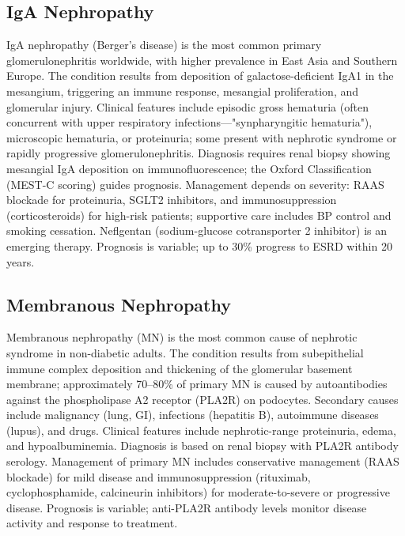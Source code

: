 \subsection{IgA Nephropathy}
\label{sec:IgA Nephropathy}
IgA nephropathy (Berger's disease) is the most common primary glomerulonephritis worldwide, with higher prevalence in East Asia and Southern Europe. The condition results from deposition of galactose-deficient IgA1 in the mesangium, triggering an immune response, mesangial proliferation, and glomerular injury. Clinical features include episodic gross hematuria (often concurrent with upper respiratory infections---"synpharyngitic hematuria"), microscopic hematuria, or proteinuria; some present with nephrotic syndrome or rapidly progressive glomerulonephritis. Diagnosis requires renal biopsy showing mesangial IgA deposition on immunofluorescence; the Oxford Classification (MEST-C scoring) guides prognosis. Management depends on severity: RAAS blockade for proteinuria, SGLT2 inhibitors, and immunosuppression (corticosteroids) for high-risk patients; supportive care includes BP control and smoking cessation. Neflgentan (sodium-glucose cotransporter 2 inhibitor) is an emerging therapy. Prognosis is variable; up to 30\% progress to ESRD within 20 years.

\subsection{Membranous Nephropathy}
\label{sec:Membranous Nephropathy}
Membranous nephropathy (MN) is the most common cause of nephrotic syndrome in non-diabetic adults. The condition results from subepithelial immune complex deposition and thickening of the glomerular basement membrane; approximately 70--80\% of primary MN is caused by autoantibodies against the phospholipase A2 receptor (PLA2R) on podocytes. Secondary causes include malignancy (lung, GI), infections (hepatitis B), autoimmune diseases (lupus), and drugs. Clinical features include nephrotic-range proteinuria, edema, and hypoalbuminemia. Diagnosis is based on renal biopsy with PLA2R antibody serology. Management of primary MN includes conservative management (RAAS blockade) for mild disease and immunosuppression (rituximab, cyclophosphamide, calcineurin inhibitors) for moderate-to-severe or progressive disease. Prognosis is variable; anti-PLA2R antibody levels monitor disease activity and response to treatment.

